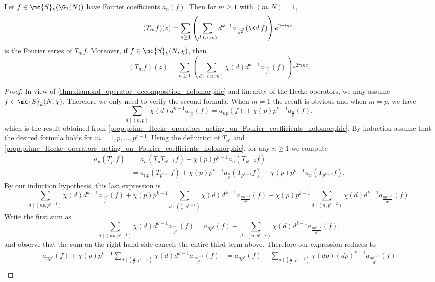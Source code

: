     \begin{proposition}\label{prop:general_Hecke_operators_acting_on_Fourier_coefficients_holomorphic}
      Let $f \in \mc{S}_{k}(\G_{1}(N))$ have Fourier coefficients $a_{n}(f)$. Then for $m \ge 1$ with $(m,N) = 1$,
      \[
        (T_{m}f)(z) = \sum_{n \ge 1}\left(\sum_{d \mid (n,m)}d^{k-1}a_{\frac{nm}{d^{2}}}(\<d\>f)\right)e^{2\pi inz},
      \]
      is the Fourier series of $T_{m}f$. Moreover, if $f \in \mc{S}_{k}(N,\chi)$, then
      \[
        (T_{m}f)(z) = \sum_{n \ge 1}\left(\sum_{d \mid (n,m)}\chi(d)d^{k-1}a_{\frac{nm}{d^{2}}}(f)\right)e^{2\pi inz}.
      \]
    \end{proposition}
    \begin{proof}
      In view of \cref{thm:diamond_operator_decomposition_holomorphic} and linearity of the Hecke operators, we may assume $f \in \mc{S}_{k}(N,\chi)$. Therefore we only need to verify the second formula. When $m = 1$ the result is obvious and when $m = p$, we have
      \[
        \sum_{d \mid (n,p)}\chi(d)d^{k-1}a_{\frac{np}{d^{2}}}(f) = a_{np}(f)+\chi(p)p^{k-1}a_{\frac{n}{p}}(f),
      \]
      which is the result obtained from \cref{prop:prime_Hecke_operators_acting_on_Fourier_coefficients_holomorphic}. By induction assume that the desired formula holds for $m = 1,p,\ldots,p^{r-1}$. Using the definition of $T_{p^{r}}$ and \cref{prop:prime_Hecke_operators_acting_on_Fourier_coefficients_holomorphic}, for any $n \ge 1$ we compute
      \begin{align*}
        a_{n}(T_{p^{r}}f) &= a_{n}(T_{p}T_{p^{r-1}}f)-\chi(p)p^{k-1}a_{n}(T_{p^{r-2}}f) \\
        &= a_{np}(T_{p^{r-1}}f)+\chi(p)p^{k-1}a_{\frac{n}{p}}(T_{p^{r-1}}f)-\chi(p)p^{k-1}a_{n}(T_{p^{r-2}}f).
      \end{align*}
      By our induction hypothesis, this last expression is
      \[
        \sum_{d \mid (np,p^{r-1})}\chi(d)d^{k-1}a_{\frac{np^{r}}{d^{2}}}(f)+\chi(p)p^{k-1}\sum_{d \mid \left(\frac{n}{p},p^{r-1}\right)}\chi(d)d^{k-1}a_{\frac{np^{r-2}}{d^{2}}}(f)-\chi(p)p^{k-1}\sum_{d \mid (n,p^{r-2})}\chi(d)d^{k-1}a_{\frac{np^{r-2}}{d^{2}}}(f).
      \]
      Write the first sum as
      \[
        \sum_{d \mid (np,p^{r-1})}\chi(d)d^{k-1}a_{\frac{np^{r}}{d^{2}}}(f) = a_{np^{r}}(f)+\sum_{d \mid (n,p^{r-2})}\chi(d)d^{k-1}a_{\frac{np^{r-2}}{d^{2}}}(f),
      \]
      and observe that the sum on the right-hand side cancels the entire third term above. Therefore our expression reduces to
      \begin{align*}
        a_{np^{r}}(f)+\chi(p)p^{k-1}\sum_{d \mid \left(\frac{n}{p},p^{r-1}\right)}\chi(d)d^{k-1}a_{\frac{np^{r-2}}{d^{2}}}(f) &= a_{np^{r}}(f)+\sum_{d \mid \left(\frac{n}{p},p^{r-1}\right)}\chi(dp)(dp)^{k-1}a_{\frac{np^{r-2}}{d^{2}}}(f) \\

\end{align*}
\end{proof}
